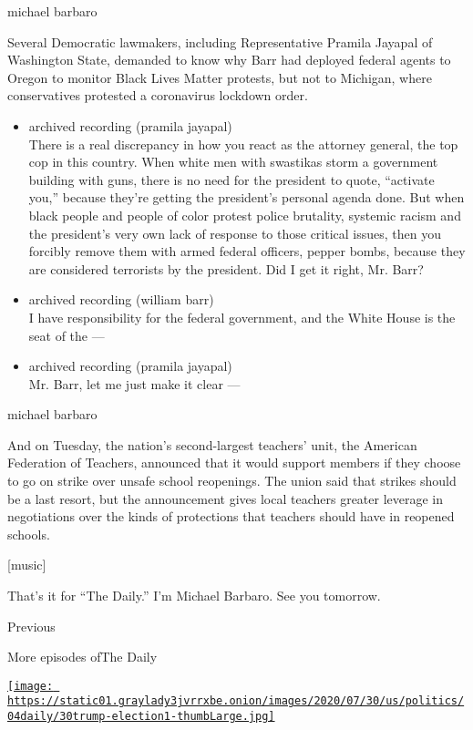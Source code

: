michael barbaro

Several Democratic lawmakers, including Representative Pramila Jayapal
of Washington State, demanded to know why Barr had deployed federal
agents to Oregon to monitor Black Lives Matter protests, but not to
Michigan, where conservatives protested a coronavirus lockdown order.

\begin{itemize}
\item
  archived recording (pramila jayapal)\\
  There is a real discrepancy in how you react as the attorney general,
  the top cop in this country. When white men with swastikas storm a
  government building with guns, there is no need for the president to
  quote, ``activate you,'' because they're getting the president's
  personal agenda done. But when black people and people of color
  protest police brutality, systemic racism and the president's very own
  lack of response to those critical issues, then you forcibly remove
  them with armed federal officers, pepper bombs, because they are
  considered terrorists by the president. Did I get it right, Mr. Barr?
\item
  archived recording (william barr)\\
  I have responsibility for the federal government, and the White House
  is the seat of the ---
\item
  archived recording (pramila jayapal)\\
  Mr. Barr, let me just make it clear ---
\end{itemize}

michael barbaro

And on Tuesday, the nation's second-largest teachers' unit, the American
Federation of Teachers, announced that it would support members if they
choose to go on strike over unsafe school reopenings. The union said
that strikes should be a last resort, but the announcement gives local
teachers greater leverage in negotiations over the kinds of protections
that teachers should have in reopened schools.

{[}music{]}

That's it for ``The Daily.'' I'm Michael Barbaro. See you tomorrow.

Previous

More episodes ofThe Daily

\href{https://www.nytimes3xbfgragh.onion/2020/08/04/podcasts/the-daily/mail-in-voting-president-trump.html?action=click\&module=audio-series-bar\&region=header\&pgtype=Article}{\texttt{[image: https://static01.graylady3jvrrxbe.onion/images/2020/07/30/us/politics/04daily/30trump-election1-thumbLarge.jpg]}}

